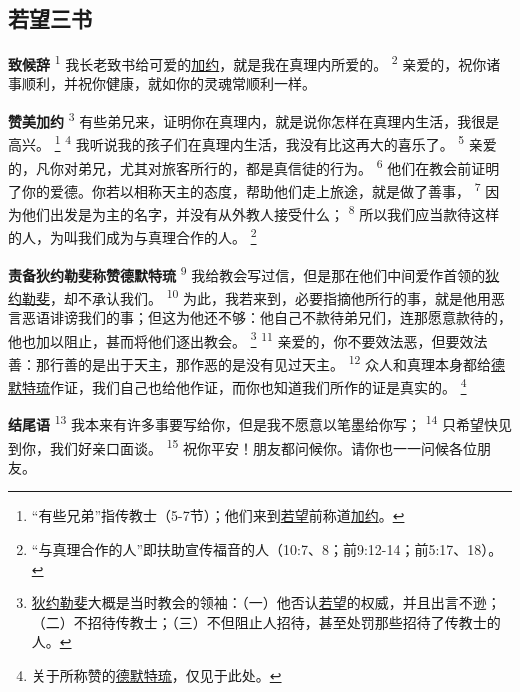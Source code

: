 \setlength\columnsep{0.6cm}
\begin{multicols}{2}

\chapter*{若望三书}


\textbf{致候辞\quad}
\textsuperscript{1}
我长老致书给可爱的\uline{加约}，就是我在真理内所爱的。
\textsuperscript{2}
亲爱的，祝你诸事顺利，并祝你健康，就如你的灵魂常顺利一样。

\textbf{赞美加约\quad}
\textsuperscript{3}
有些弟兄来，证明你在真理内，就是说你怎样在真理内生活，我很是高兴。
\renewcommand\thefootnote{\ding{\numexpr171+\value{footnote}}}
\footnote{“有些兄弟”指传教士（5-7节）；他们来到\uline{若望}前称道\uline{加约}。}
\textsuperscript{4}
我听说我的孩子们在真理内生活，我没有比这再大的喜乐了。
\textsuperscript{5}
亲爱的，凡你对弟兄，尤其对旅客所行的，都是真信徒的行为。
\textsuperscript{6}
他们在教会前证明了你的爱德。你若以相称天主的态度，帮助他们走上旅途，就是做了善事，
\textsuperscript{7}
因为他们出发是为主的名字，并没有从外教人接受什么；
\textsuperscript{8}
所以我们应当款待这样的人，为叫我们成为与真理合作的人。
\footnote{“与真理合作的人”即扶助宣传福音的人（10:7、8；前9:12-14；前5:17、18）。}

\textbf{责备狄约勒斐称赞德默特琉\quad}
\textsuperscript{9}
我给教会写过信，但是那在他们中间爱作首领的\uline{狄约勒斐}，却不承认我们。
\textsuperscript{10}
为此，我若来到，必要指摘他所行的事，就是他用恶言恶语诽谤我们的事；但这为他还不够：他自己不款待弟兄们，连那愿意款待的，他也加以阻止，甚而将他们逐出教会。
\footnote{\uline{狄约勒斐}大概是当时教会的领袖：（一）他否认\uline{若望}的权威，并且出言不逊；（二）不招待传教士；（三）不但阻止人招待，甚至处罚那些招待了传教士的人。}
\textsuperscript{11}
亲爱的，你不要效法恶，但要效法善：那行善的是出于天主，那作恶的是没有见过天主。
\textsuperscript{12}
众人和真理本身都给\uline{德默特琉}作证，我们自己也给他作证，而你也知道我们所作的证是真实的。
\footnote{关于所称赞的\uline{德默特琉}，仅见于此处。}

\textbf{结尾语\quad}
\textsuperscript{13}
我本来有许多事要写给你，但是我不愿意以笔墨给你写；
\textsuperscript{14}
只希望快见到你，我们好亲口面谈。
\textsuperscript{15}
祝你平安！朋友都问候你。请你也一一问候各位朋友。
\end{multicols}